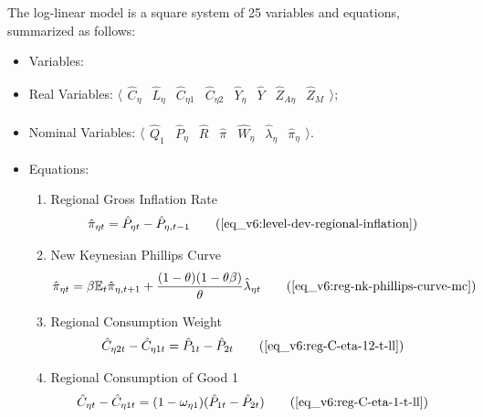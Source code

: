 \documentclass[../thesis.tex]{subfiles}
\begin{document}
The log-linear model is a square system of 25 variables and equations, summarized as follows:

{\singlespacing

\begin{itemize}
	
	\item Variables:
	
	\item Real Variables: $\langle \begin{matrix} \hat{C}_{\eta } & \hat{L}_{\eta } & \hat{C}_{\eta 1} & \hat{C}_{\eta 2} & \hat{Y}_{\eta } & \hat{Y}_{} & \hat{Z}_{A\eta } & \hat{Z}_{M} \end{matrix} \rangle$;
	
	\item Nominal Variables: $\langle \begin{matrix} \hat{Q}_{1} & \hat{P}_{\eta } & \hat{R}_{} & \hat{\pi}_{} & \hat{W}_{\eta } & \hat{\lambda}_{\eta } & \hat{\pi}_{\eta } \end{matrix} \rangle$.
	
	\item Equations:
	
	\begin{enumerate}
		
		\item Regional Gross Inflation Rate
		\begin{align}
			\hat{\pi}_{\eta t} &= \hat{P}_{\eta t} - \hat{P}_{\eta, t-1} \tag{\ref{eq_v6:level-dev-regional-inflation}}
		\end{align}
		
		\item New Keynesian Phillips Curve
		\begin{align}
			\hat{\pi}_{\eta t} &= \beta \E \hat{\pi}_{\eta, t+1} + \frac{(1-\theta) (1- \theta \beta)}{\theta} \hat{\lambda}_{\eta t} \tag{\ref{eq_v6:reg-nk-phillips-curve-mc}}
		\end{align}
		
		\item Regional Consumption Weight
		\begin{align}
			\hat{C}_{\eta 2t} - \hat{C}_{\eta 1t} &= \hat{P}_{1t} - \hat{P}_{2t} \tag{\ref{eq_v6:reg-C-eta-12-t-ll}}
		\end{align}
		
		\item Regional Consumption of Good 1
		\begin{align}
			\hat{C}_{\eta t} - \hat{C}_{\eta 1 t} &= (1 - \omega_{\eta 1}) (\hat{P}_{1t} - \hat{P}_{2t}) \tag{\ref{eq_v6:reg-C-eta-1-t-ll}}
		\end{align}
		

\end{enumerate}
\end{itemize}}
\end{document}
